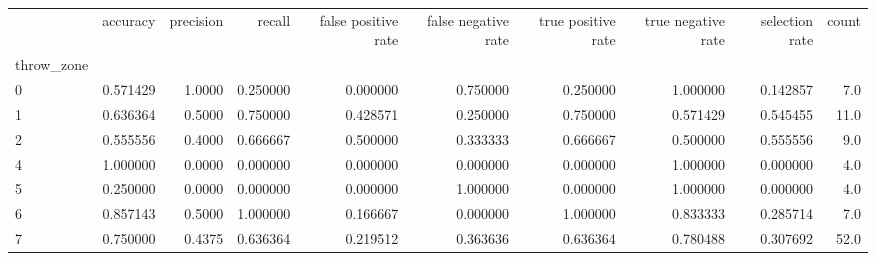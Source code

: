\begin{tabular}{lrrrrrrrrr}
\toprule
{} &  accuracy &  precision &    recall &  false positive rate &  false negative rate &  true positive rate &  true negative rate &  selection rate &  count \\
throw\_zone &           &            &           &                      &                      &                     &                     &                 &        \\
\midrule
0          &  0.571429 &     1.0000 &  0.250000 &             0.000000 &             0.750000 &            0.250000 &            1.000000 &        0.142857 &    7.0 \\
1          &  0.636364 &     0.5000 &  0.750000 &             0.428571 &             0.250000 &            0.750000 &            0.571429 &        0.545455 &   11.0 \\
2          &  0.555556 &     0.4000 &  0.666667 &             0.500000 &             0.333333 &            0.666667 &            0.500000 &        0.555556 &    9.0 \\
4          &  1.000000 &     0.0000 &  0.000000 &             0.000000 &             0.000000 &            0.000000 &            1.000000 &        0.000000 &    4.0 \\
5          &  0.250000 &     0.0000 &  0.000000 &             0.000000 &             1.000000 &            0.000000 &            1.000000 &        0.000000 &    4.0 \\
6          &  0.857143 &     0.5000 &  1.000000 &             0.166667 &             0.000000 &            1.000000 &            0.833333 &        0.285714 &    7.0 \\
7          &  0.750000 &     0.4375 &  0.636364 &             0.219512 &             0.363636 &            0.636364 &            0.780488 &        0.307692 &   52.0 \\
\bottomrule
\end{tabular}
